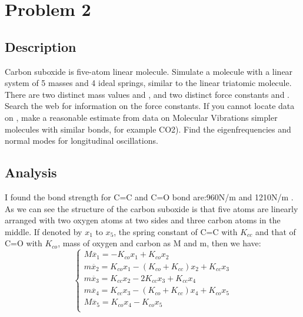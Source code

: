 \documentclass[11pt,letterpaper]{article}
\begin{document}
\newpage

\section{Problem 2}

\subsection{Description}
  Carbon suboxide is five-atom linear molecule. Simulate a   molecule with a linear system of 5 masses and 4 ideal springs, similar to the linear triatomic molecule. There are two distinct mass values   and  , and two distinct force constants   and  . Search the web for information on the force constants. If you cannot locate data on  , make a reasonable estimate from data on Molecular Vibrations simpler molecules with similar bonds, for example CO2). Find the eigenfrequencies and normal modes for longitudinal oscillations.

\subsection{Analysis}
I found the bond strength for C=C and C=O bond are:960N/m and 1210N/m \cite{bond}. As we can see the structure of the carbon suboxide is that five atoms are linearly arranged with two oxygen atoms at two sides and three carbon atoms in the middle. If denoted by $x_1$ to $x_5$, the spring constant of C=C with $K_{cc}$ and that of C=O with $K_{co}$, mass of oxygen and carbon as M and m, then we have:
\[
  \begin{cases}
	M\ddot{x_1}=-K_{co}x_1+K_{co}x_2\\
	m\ddot{x_2}=K_{co}x_1-(K_{co}+K_{cc})x_2+K_{cc}x_3\\
	m\ddot{x_3}=K_{cc}x_2-2K_{cc}x_3+K_{cc}x_4\\
	m\ddot{x_4}=K_{cc}x_3-(K_{co}+K_{cc})x_4+K_{co}x_5\\
	M\ddot{x_5}=K_{co}x_4-K_{co}x_5\\
  \end{cases}
\]
\end{document}
